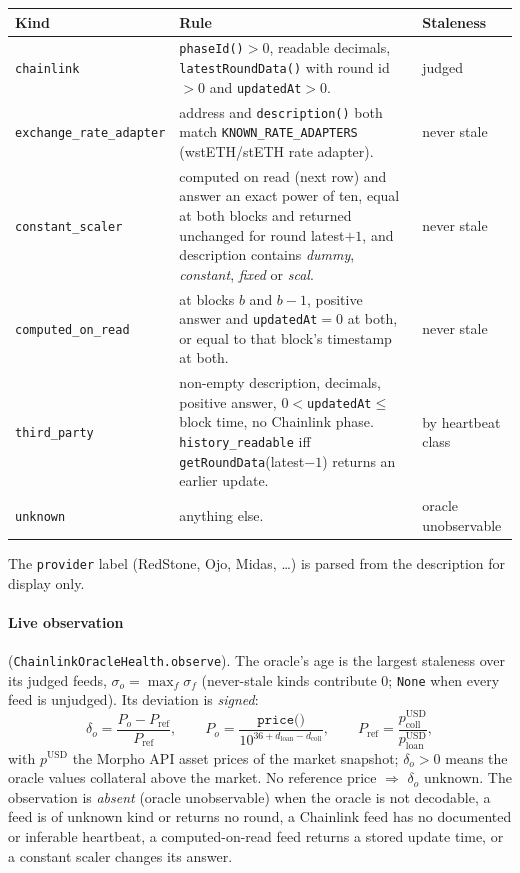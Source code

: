 \documentclass[11pt,a4paper]{article}
\newcommand{\code}[1]{\texttt{#1}}
\begin{document}
\begin{center}\small
\begin{tabularx}{\textwidth}{@{}L{3.2cm}YL{2.4cm}@{}}
\toprule
Kind & Rule & Staleness \\
\midrule
\code{chainlink} & \code{phaseId()}$>0$, readable decimals, \code{latestRoundData()} with round id $>0$ and \code{updatedAt}$>0$. & judged \\
\code{exchange\_rate\_adapter} & address and \code{description()} both match \code{KNOWN\_RATE\_ADAPTERS} (wstETH/stETH rate adapter). & never stale \\
\code{constant\_scaler} & computed on read (next row) and answer an exact power of ten, equal at both blocks and returned unchanged for round latest$+1$, and description contains \emph{dummy}, \emph{constant}, \emph{fixed} or \emph{scal}. & never stale \\
\code{computed\_on\_read} & at blocks $b$ and $b-1$, positive answer and \code{updatedAt}$=0$ at both, or equal to that block's timestamp at both. & never stale \\
\code{third\_party} & non-empty description, decimals, positive answer, $0<$\code{updatedAt}$\leq$ block time, no Chainlink phase. \code{history\_readable} iff \code{getRoundData}(latest$-1$) returns an earlier update. & by heartbeat class \\
\code{unknown} & anything else. & oracle unobservable \\
\bottomrule
\end{tabularx}
\end{center}
The \code{provider} label (RedStone, Ojo, Midas, \dots) is parsed from the
description for display only.

\paragraph{Live observation} (\code{ChainlinkOracleHealth.observe}). The oracle's
age is the largest staleness over its judged feeds,
$\sigma_o=\max_f\sigma_f$ (never-stale kinds contribute 0; \code{None} when every
feed is unjudged). Its deviation is \emph{signed}:
\begin{equation}
\delta_o=\frac{P_o-P_{\text{ref}}}{P_{\text{ref}}},\qquad
P_o=\frac{\code{price()}}{10^{36+d_{\text{loan}}-d_{\text{coll}}}},\qquad
P_{\text{ref}}=\frac{p^{\text{USD}}_{\text{coll}}}{p^{\text{USD}}_{\text{loan}}},
\end{equation}
with $p^{\text{USD}}$ the Morpho API asset prices of the market snapshot;
$\delta_o>0$ means the oracle values collateral above the market. No reference
price $\Rightarrow$ $\delta_o$ unknown. The observation is \emph{absent}
(oracle unobservable) when the oracle is not decodable, a feed is of unknown kind
or returns no round, a Chainlink feed has no documented or inferable heartbeat,
a computed-on-read feed returns a stored update time, or a constant scaler
changes its answer.
\end{document}
